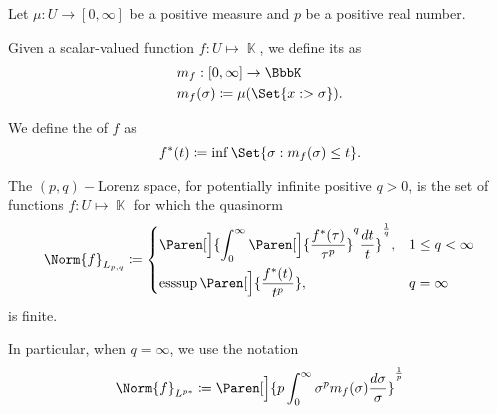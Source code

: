 \begin{definition}\label{def:distribution_function}\cite[6]{Bergh1976}
  Let \( \mu: U \to [0, \infty] \) be a positive measure and \( p \) be a positive real number.

  \begin{DefEnum}
     Given a scalar-valued function \( f: U \mapsto \BbbK \), we define its  as
    \begin{align*}
      &m_f: [0, \infty] \to \BbbK \\
      &m_f(\sigma) \coloneqq \mu(\Set{ x :  > \sigma }).
    \end{align*}

     We define the  of \( f \) as
    \begin{equation*}
      f^*(t) \coloneqq \inf\Set{ \sigma : m_f(\sigma) \leq t }.
    \end{equation*}

     The \( (p, q)-\)Lorenz space, for potentially infinite positive \( q > 0 \), is the set of functions \( f: U \mapsto \BbbK \) for which the quasinorm
    \begin{equation*}
      \Norm{f}_{L_{p,q}} \coloneqq \begin{dcases}
        \Paren[\Big]{\int_0^\infty \Paren[\Big]{\frac {f^*(\tau)} {\tau^p}}^q \frac {d t} t}^{\frac 1 q}, &1 \leq q < \infty \\
        \Ess\sup\Paren[\Big]{\frac {f^*(t)} {t^p}}, &q = \infty
      \end{dcases}
    \end{equation*}
    is finite.

    In particular, when \( q = \infty \), we use the notation
    \begin{equation*}
      \Norm{f}_{L^{p*}} \coloneqq \Paren[\Big]{p \int_0^\infty \sigma^p m_f(\sigma) \frac {d \sigma} \sigma}^{\frac 1 p}
    \end{equation*}
  \end{DefEnum}
\end{definition}

